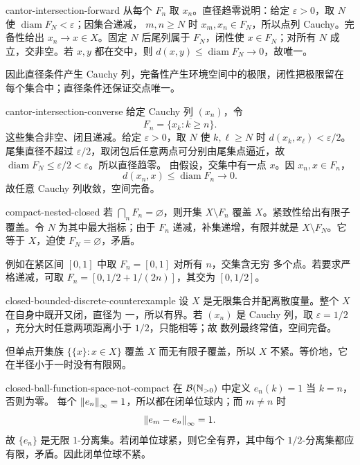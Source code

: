 \begin{solution}{cantor-intersection-forward}
从每个 \(F_n\) 取 \(x_n\)。直径趋零说明：给定 \(\varepsilon>0\)，取
\(N\) 使 \(\operatorname{diam}F_N<\varepsilon\)；因集合递减，
\(m,n\ge N\) 时 \(x_m,x_n\in F_N\)，所以点列 Cauchy。完备性给出
\(x_n\to x\in X\)。固定 \(N\) 后尾列属于 \(F_N\)，闭性使
\(x\in F_N\)；对所有 \(N\) 成立，交非空。若 \(x,y\) 都在交中，则
\(d(x,y)\le\operatorname{diam}F_N\to0\)，故唯一。

因此直径条件产生 Cauchy 列，完备性产生环境空间中的极限，闭性把极限留在
每个集合中；直径条件还保证交点唯一。
\end{solution}

\begin{solution}{cantor-intersection-converse}
给定 Cauchy 列 \((x_n)\)，令
\[
 F_n=\overline{\{x_k:k\ge n\}}.
\]
这些集合非空、闭且递减。给定 \(\varepsilon>0\)，取 \(N\) 使
\(k,\ell\ge N\) 时 \(d(x_k,x_\ell)<\varepsilon/2\)。尾集直径不超过
\(\varepsilon/2\)，取闭包后任意两点可分别由尾集点逼近，故
\(\operatorname{diam}F_N\le\varepsilon/2<\varepsilon\)。所以直径趋零。
由假设，交集中有一点 \(x\)。因 \(x_n,x\in F_n\)，
\[
 d(x_n,x)\le\operatorname{diam}F_n\longrightarrow0.
\]
故任意 Cauchy 列收敛，空间完备。
\end{solution}

\begin{solution}{compact-nested-closed}
若 \(\bigcap_nF_n=\varnothing\)，则开集 \(X\setminus F_n\) 覆盖
\(X\)。紧致性给出有限子覆盖。令 \(N\) 为其中最大指标；由于
\(F_n\) 递减，补集递增，有限并就是 \(X\setminus F_N\)。它等于
\(X\)，迫使 \(F_N=\varnothing\)，矛盾。

例如在紧区间 \([0,1]\) 中取 \(F_n=[0,1]\) 对所有 \(n\)，交集含无穷
多个点。若要求严格递减，可取 \(F_n=[0,1/2+1/(2n)]\)，其交为 \([0,1/2]\)。
\end{solution}

\begin{solution}{closed-bounded-discrete-counterexample}
设 \(X\) 是无限集合并配离散度量。整个 \(X\) 在自身中既开又闭，直径为
一，所以有界。若 \((x_n)\) 是 Cauchy 列，取
\(\varepsilon=1/2\)，充分大时任意两项距离小于 \(1/2\)，只能相等；故
数列最终常值，空间完备。

但单点开集族 \(\{\{x\}:x\in X\}\) 覆盖 \(X\) 而无有限子覆盖，所以
\(X\) 不紧。等价地，它在半径小于一时没有有限网。
\end{solution}

\begin{solution}{closed-ball-function-space-not-compact}
在 \(\mathcal B(\mathbb{N}_{>0})\) 中定义 \(e_n(k)=1\) 当 \(k=n\)，否则为零。
每个 \(\left\lVert e_n\right\rVert_\infty=1\)，所以都在闭单位球内；而 \(m\ne n\) 时
\[
 \left\lVert e_m-e_n\right\rVert_\infty=1.
\]
故 \(\{e_n\}\) 是无限 \(1\)-分离集。若闭单位球紧，则它全有界，其中每个
\(1/2\)-分离集都应有限，矛盾。因此闭单位球不紧。
\end{solution}

